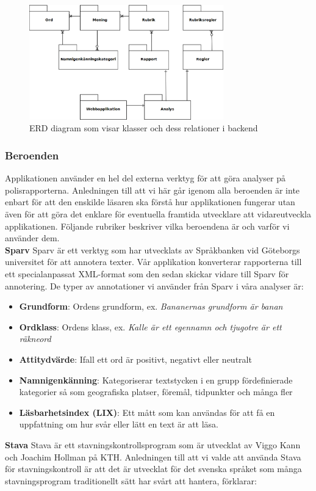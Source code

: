 \documentclass[swedish]{maucsthesis}
\begin{document}
\begin{figure}[H]
    \centering
    \includegraphics[width=0.75\textwidth]{backenderd}
    \caption{ERD diagram som visar klasser och dess relationer i backend}
    \label{fig:erdbackend}
\end{figure}

\subsubsection{Beroenden}

Applikationen använder en hel del externa verktyg för att göra analyser på
polisrapporterna. Anledningen till att vi här går igenom alla beroenden är inte
enbart för att den enskilde läsaren ska förstå hur applikationen fungerar utan
även för att göra det enklare för eventuella framtida utvecklare att
vidareutveckla applikationen. Följande rubriker beskriver vilka beroendena är
och varför vi använder dem. 
\\[1PC]
\textbf{Sparv} \newline
Sparv är ett verktyg som har utvecklats av Språkbanken vid Göteborgs universitet
för att annotera texter. Vår applikation konverterar rapporterna till ett
specialanpassat XML-format som den sedan skickar vidare till Sparv för
annotering. De typer av annotationer vi använder från Sparv i våra analyser är:

\begin{itemize}
\item \textbf{Grundform}: Ordens grundform, ex. \textit{Bananernas grundform är
    banan}
\item \textbf{Ordklass}: Ordens klass, ex. \textit{Kalle är ett egennamn och
    tjugotre är ett räkneord}
\item \textbf{Attitydvärde}: Ifall ett ord är positivt, negativt eller neutralt
\item \textbf{Namnigenkänning}: Kategoriserar textstycken i en grupp
  fördefinierade kategorier så som geografiska platser, föremål, tidpunkter och
  många fler
\item \textbf{Läsbarhetsindex (LIX)}: Ett mått som kan användas för att få en
  uppfattning om hur svår eller lätt en text är att läsa.
\end{itemize}
\textbf{Stava} \newline
Stava är ett stavningskontrollsprogram som är utvecklat av Viggo Kann och
Joachim Hollman på KTH. Anledningen till att vi valde att använda Stava för
stavningskontroll är att det är utvecklat för det svenska språket som många
stavningsprogram traditionellt sätt har svårt att hantera, \cite{kann:1997}
förklarar:
\end{document}
